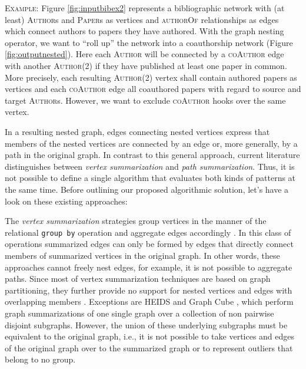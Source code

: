 \begin{em}
 \textsc{Example}:  Figure \ref{fig:inputbibex2} represents a bibliographic network with (at least) \textsc{Author}s and \textsc{Paper}s as vertices and \textsc{authorOf} relationships as edges which connect authors to papers they have authored. With the graph nesting operator, we want to ``roll up'' the network into a coauthorship network (Figure \ref{fig:outputnested}). Here each \textsc{Author} will be connected by a \textsc{coAuthor} edge with another \textsc{Author}(2) if they have published at least one paper in common.
 More precisely, each resulting \textsc{Author}(2) vertex shall contain authored papers as vertices and each \textsc{coAuthor} edge all coauthored papers with regard to source and target \textsc{Author}s. However, we want to exclude \textsc{coAuthor} hooks over the same vertex.
\end{em}

In a resulting nested graph, edges connecting nested vertices express that members of the nested vertices are connected by an edge or, more generally, by a path in the original graph.
In contrast to this general approach, current literature distinguishes between \textit{vertex summarization} and \textit{path summarization}. Thus, it is not possible to define a single algorithm that evaluates both kinds of patterns at the same time. Before outlining our proposed algorithmic solution, let's have a look on these existing approaches:

The \textit{vertex summarization} strategies group vertices in the manner of the relational \texttt{group by} operation and aggregate edges accordingly \cite{JunghannsPR17}. In this class of operations summarized edges can only be formed by edges that directly connect members of summarized vertices in the original graph. In other words, these approaches cannot freely nest edges, for example, it is not possible to aggregate paths. Since most of vertex summarization techniques are based on graph partitioning, they further provide no support for nested vertices and edges with overlapping members \cite{yin,Tian20085,jakawat}.
Exceptions are HEIDS \cite{ChengJQ16} and Graph Cube \cite{Zhao11}, which perform graph summarizations of one single graph over a collection of non pairwise disjoint subgraphs. However, the union of these underlying subgraphs must be equivalent to the original graph, i.e., it is not possible to take vertices and edges of the original graph over to the summarized graph or to represent outliers that belong to no group.

